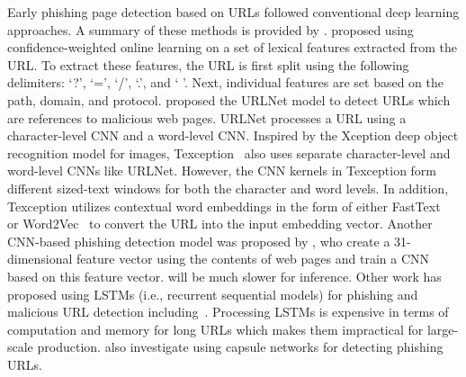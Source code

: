 Early phishing page detection based on URLs followed conventional deep learning approaches. 
A summary of these methods is provided by \citet{sahoo2017malicious}.
\citet{blum2020lexical} proposed using confidence-weighted online learning on a set of lexical features extracted from the URL. To extract these features, the URL is first split using the following delimiters:  `?', `=', `/', `.',  and ` '. Next, individual features are set based on the path, domain, and protocol.
\citet{le2018malicious} proposed the URLNet model to detect URLs which are references to malicious web pages.
URLNet processes a URL using a character-level CNN and a word-level CNN. %
Inspired by the Xception deep object recognition model for images, Texception~\citep{tajaddodianfar2020texception} also uses separate character-level and word-level CNNs like URLNet. 
However, the CNN kernels in Texception form different sized-text windows for both the character and word levels. 
In addition, Texception utilizes contextual word embeddings in the form of either FastText~\citep{joulin2017bag} or Word2Vec~\cite{mikolov2013distributed} to convert the URL into the input embedding vector.
Another CNN-based phishing detection model was proposed by \citet{yerima2020high}, who create a 31-dimensional feature vector using the contents of web pages and train a CNN based on this feature vector.
will be much slower for inference.
Other work has proposed using LSTMs (i.e., recurrent sequential models) for phishing and malicious URL detection including~\citet{ren2019bidirectional,peng2019joint}.
Processing LSTMs is expensive in terms of computation and memory for long URLs which makes them impractical for large-scale production. 
\citet{huang2019phishing} also investigate using capsule networks for detecting phishing URLs.
